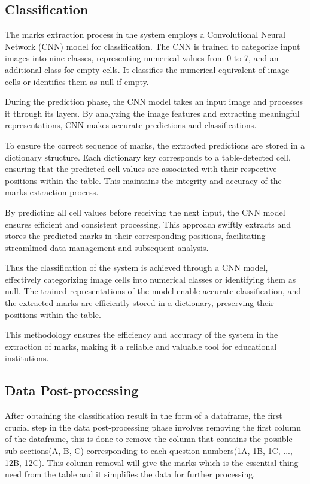 \subsection{Classification}

\noindent The marks extraction process in the system employs a Convolutional Neural Network (CNN) model for classification. The CNN is trained to categorize input images into nine classes, representing numerical values from 0 to 7, and an additional class for empty cells. It classifies the numerical equivalent of image cells or identifies them as null if empty.

\clearpage

\noindent During the prediction phase, the CNN model takes an input image and processes it through its layers. By analyzing the image features and extracting meaningful representations, CNN makes accurate predictions and classifications.

\noindent To ensure the correct sequence of marks, the extracted predictions are stored in a dictionary structure. Each dictionary key corresponds to a table-detected cell, ensuring that the predicted cell values are associated with their respective positions within the table. This maintains the integrity and accuracy of the marks extraction process.

\noindent By predicting all cell values before receiving the next input, the CNN model ensures efficient and consistent processing. This approach swiftly extracts and stores the predicted marks in their corresponding positions, facilitating streamlined data management and subsequent analysis.

\noindent  Thus the classification of the system is achieved through a CNN model, effectively categorizing image cells into numerical classes or identifying them as null. The trained representations of the model enable accurate classification, and the extracted marks are efficiently stored in a dictionary, preserving their positions within the table. 

\noindent This methodology ensures the efficiency and accuracy of the system in the extraction of marks, making it a reliable and valuable tool for educational institutions.

\subsection{Data Post-processing}

\noindent After obtaining the classification result in the form of a dataframe, the first crucial step in the data post-processing phase involves removing the first column of the dataframe, this is done to remove the column that contains the possible sub-sections(A, B, C) corresponding to each question numbers(1A, 1B, 1C, ..., 12B, 12C). This column removal will give the marks which is the essential thing need from the table and it simplifies the data for further processing.

